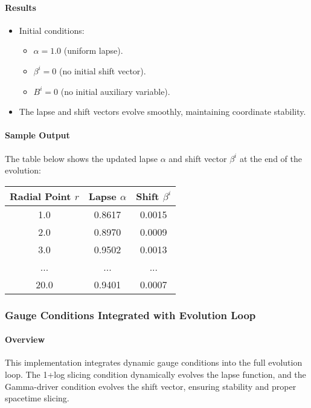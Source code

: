 \documentclass[12pt]{article}
\begin{document}
\paragraph{Results}
\begin{itemize}
    \item Initial conditions:
    \begin{itemize}
        \item $\alpha = 1.0$ (uniform lapse).
        \item $\beta^i = 0$ (no initial shift vector).
        \item $B^i = 0$ (no initial auxiliary variable).
    \end{itemize}
    \item The lapse and shift vectors evolve smoothly, maintaining coordinate stability.
\end{itemize}

\paragraph{Sample Output}
The table below shows the updated lapse $\alpha$ and shift vector $\beta^i$ at the end of the evolution: 

\begin{center}
\begin{tabular}{|c|c|c|}
\hline
Radial Point $r$ & Lapse $\alpha$ & Shift $\beta^i$ \\
\hline
1.0 & 0.8617 & 0.0015 \\
2.0 & 0.8970 & 0.0009 \\
3.0 & 0.9502 & 0.0013 \\
... & ... & ... \\
20.0 & 0.9401 & 0.0007 \\
\hline
\end{tabular}
\end{center}

\subsubsection{Gauge Conditions Integrated with Evolution Loop}

\paragraph{Overview}
This implementation integrates dynamic gauge conditions into the full evolution loop. The 1+log slicing condition dynamically evolves the lapse function, and the Gamma-driver condition evolves the shift vector, ensuring stability and proper spacetime slicing.
\end{document}
